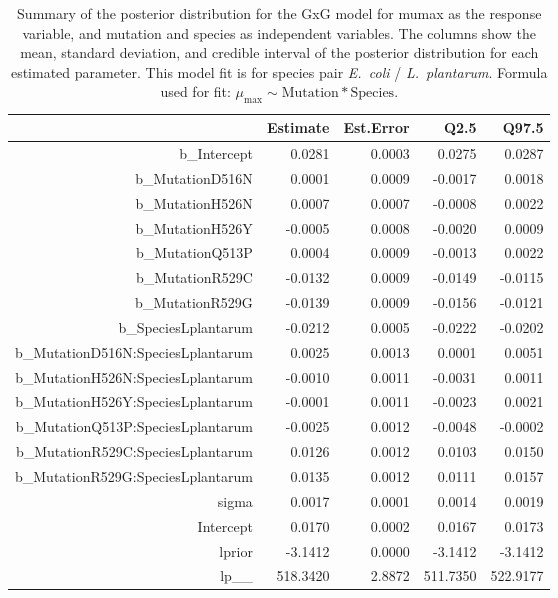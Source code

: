 \begin{table}[ht]
\centering
\begin{tabular}{rrrrr}
  \hline
 & Estimate & Est.Error & Q2.5 & Q97.5 \\ 
  \hline
b\_Intercept & 0.0281 & 0.0003 & 0.0275 & 0.0287 \\ 
  b\_MutationD516N & 0.0001 & 0.0009 & -0.0017 & 0.0018 \\ 
  b\_MutationH526N & 0.0007 & 0.0007 & -0.0008 & 0.0022 \\ 
  b\_MutationH526Y & -0.0005 & 0.0008 & -0.0020 & 0.0009 \\ 
  b\_MutationQ513P & 0.0004 & 0.0009 & -0.0013 & 0.0022 \\ 
  b\_MutationR529C & -0.0132 & 0.0009 & -0.0149 & -0.0115 \\ 
  b\_MutationR529G & -0.0139 & 0.0009 & -0.0156 & -0.0121 \\ 
  b\_SpeciesLplantarum & -0.0212 & 0.0005 & -0.0222 & -0.0202 \\ 
  b\_MutationD516N:SpeciesLplantarum & 0.0025 & 0.0013 & 0.0001 & 0.0051 \\ 
  b\_MutationH526N:SpeciesLplantarum & -0.0010 & 0.0011 & -0.0031 & 0.0011 \\ 
  b\_MutationH526Y:SpeciesLplantarum & -0.0001 & 0.0011 & -0.0023 & 0.0021 \\ 
  b\_MutationQ513P:SpeciesLplantarum & -0.0025 & 0.0012 & -0.0048 & -0.0002 \\ 
  b\_MutationR529C:SpeciesLplantarum & 0.0126 & 0.0012 & 0.0103 & 0.0150 \\ 
  b\_MutationR529G:SpeciesLplantarum & 0.0135 & 0.0012 & 0.0111 & 0.0157 \\ 
  sigma & 0.0017 & 0.0001 & 0.0014 & 0.0019 \\ 
  Intercept & 0.0170 & 0.0002 & 0.0167 & 0.0173 \\ 
  lprior & -3.1412 & 0.0000 & -3.1412 & -3.1412 \\ 
  lp\_\_ & 518.3420 & 2.8872 & 511.7350 & 522.9177 \\ 
   \hline
\end{tabular}
\caption{Summary of the posterior distribution for the GxG model for mumax as the response variable, and mutation and species as independent variables. The columns show the mean, standard deviation, and credible interval of the posterior distribution for each estimated parameter. This model fit is for species pair \textit{E.~coli} / \textit{L.~plantarum}.  Formula used for fit: $\mu_{\text{max}} \sim \text{Mutation} * \text{Species}$.} 
\label{supptab:GxG_mumax_EC_LP}
\end{table}



